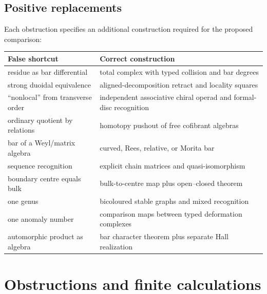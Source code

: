 \section{Positive replacements}
Each obstruction specifies an additional construction required for the proposed comparison:
\begin{center}
\begin{tabularx}{0.96\textwidth}{p{}X}
\toprule
False shortcut & Correct construction\\
\midrule
residue as bar differential & total complex with typed collision and bar degrees\\
strong duoidal equivalence & aligned-decomposition retract and locality squares\\
``nonlocal'' from transverse order & independent associative chiral operad and formal-disc recognition\\
ordinary quotient by relations & homotopy pushout of free cofibrant algebras\\
bar of a Weyl/matrix algebra & curved, Rees, relative, or Morita bar\\
sequence recognition & explicit chain matrices and quasi-isomorphism\\
boundary centre equals bulk & bulk-to-centre map plus open--closed theorem\\
one genus & bicoloured stable graphs and mixed recognition\\
one anomaly number & comparison maps between typed deformation complexes\\
automorphic product as algebra & bar character theorem plus separate Hall realization\\
\bottomrule
\end{tabularx}
\end{center}

\chapter{Obstructions and finite calculations}\label{chap:corpus}

